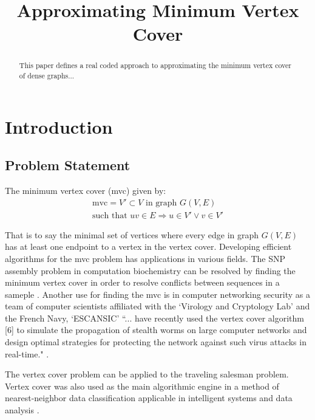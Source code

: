 \documentclass[conference,letterpaper]{IEEEtran}
\begin{document}
\title{Approximating Minimum Vertex Cover}
\author{
}

\maketitle

\begin{abstract}
    This paper defines a real coded approach to approximating the minimum vertex cover of dense graphs...
\end{abstract}

%
%   
\section{Introduction}
\subsection{Problem Statement}
\par The minimum vertex cover (mvc) given by:
\begin{equation}
    \begin{split}
        \mbox{mvc} = V' \subset V \mbox{ in graph } G(V,E) \\
        \mbox{such that } uv \in E \Rightarrow u \in V' \lor v \in V'
    \end{split}
\end{equation}

\par That is to say the minimal set of vertices where every edge in graph $G(V,E)$ has at least one endpoint to a vertex in the vertex cover. Developing efficient algorithms for the mvc problem has applications in various fields. The SNP assembly problem in computation biochemistry can be resolved by finding the minimum vertex cover in order to resolve conflicts between sequences in a sameple \cite{pirzada}. Another use for finding the mvc is in computer networking security as a team of computer scientists affiliated with the `Virology and Cryptology Lab' and the French Navy, `ESCANSIC' ``... have recently used the vertex cover algorithm [6] to simulate the propagation of stealth worms on large computer networks and design optimal strategies for protecting the network against such virus attacks in real-time." \cite{pirzada}. 
\par The vertex cover problem can be applied to the traveling salesman problem. Vertex cover was also used as the main algorithmic engine in a method of nearest-neighbor data classification applicable in intelligent systems and data analysis \cite{gkk}.
\end{document}
